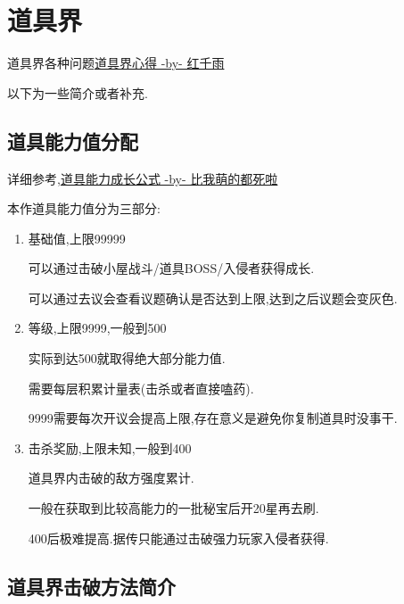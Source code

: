 	\newpage

	\section{道具界}

	道具界各种问题\href{http://tieba.baidu.com/p/3730196003}{道具界心得 -by- 红千雨}

	以下为一些简介或者补充.

	\subsection{道具能力值分配}
	
	详细参考,\href{http://tieba.baidu.com/f?kz=3834692385}{道具能力成长公式 -by- 比我萌的都死啦}

	本作道具能力值分为三部分:

	\begin{enumerate}

		\item 
		基础值,上限99999

		可以通过击破小屋战斗/道具BOSS/入侵者获得成长.

		可以通过去议会查看议题确认是否达到上限,达到之后议题会变灰色.

		\item
		等级,上限9999,一般到500

		实际到达500就取得绝大部分能力值.

		需要每层积累计量表(击杀或者直接嗑药).

		9999需要每次开议会提高上限,存在意义是避免你复制道具时没事干.

		\item
		击杀奖励,上限未知,一般到400

		道具界内击破的敌方强度累计.

		一般在获取到比较高能力的一批秘宝后开20星再去刷.

		400后极难提高.据传只能通过击破强力玩家入侵者获得.

	\end{enumerate}
	

	\subsection{道具界击破方法简介}

